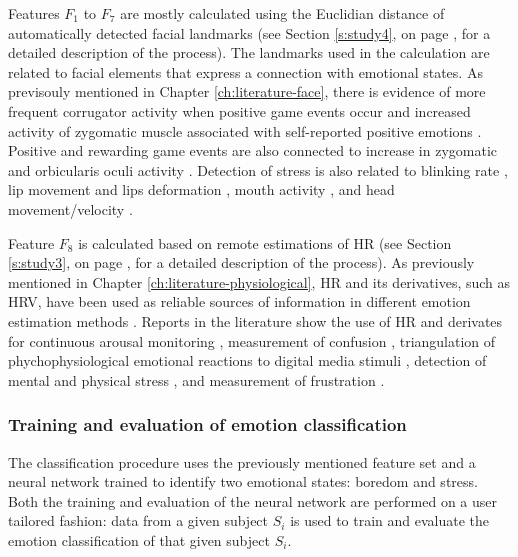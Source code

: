 Features $F_1$ to $F_7$ are mostly calculated using the Euclidian distance of automatically detected facial landmarks (see Section \ref{s:study4}, on page \pageref{s:study4}, for a detailed description of the process). The landmarks used in the calculation are related to facial elements that express a connection with emotional states. As previsouly mentioned in Chapter \ref{ch:literature-face}, there is evidence of more frequent corrugator activity when positive game events occur \parencite{hazlett2006measuring} and increased activity of zygomatic muscle associated with self-reported positive emotions \parencite{tijs2008dynamic}. Positive and rewarding game events are also connected to increase in zygomatic and orbicularis oculi activity \parencite{ravaja20051}. Detection of stress is also related to blinking rate \parencite{giannakakis2017stress,dinges2005optical}, lip movement \parencite{dinges2005optical} and lips deformation \parencite{metaxas2004image,giannakakis2017stress}, mouth activity \parencite{liao2005decision}, and head movement/velocity \parencite{giannakakis2017stress}.

Feature $F_8$ is calculated based on remote estimations of HR (see Section \ref{s:study3}, on page \pageref{s:study3}, for a detailed description of the process). As previously mentioned in Chapter \ref{ch:literature-physiological}, HR and its derivatives, such as HRV, have been used as reliable sources of information in different emotion estimation methods \parencite{kukolja2014comparative}. Reports in the literature show the use of HR and derivates for continuous arousal monitoring \parencite{grundlehner2009design}, measurement of confusion \parencite{xiao2015towards}, triangulation of phychophysiological emotional reactions to digital media stimuli \parencite{nogueira2015annotation}, detection of mental and physical stress \parencite{vandeput2009heart,garde2002effects}, and measurement of frustration \parencite{rodriguez2015vr}.

\subsubsection{Training and evaluation of emotion classification}

The classification procedure uses the previously mentioned feature set and a neural network trained to identify two emotional states: boredom and stress. Both the training and evaluation of the neural network are performed on a user tailored fashion: data from a given subject $S_i$ is used to train and evaluate the emotion classification of that given subject $S_i$.


